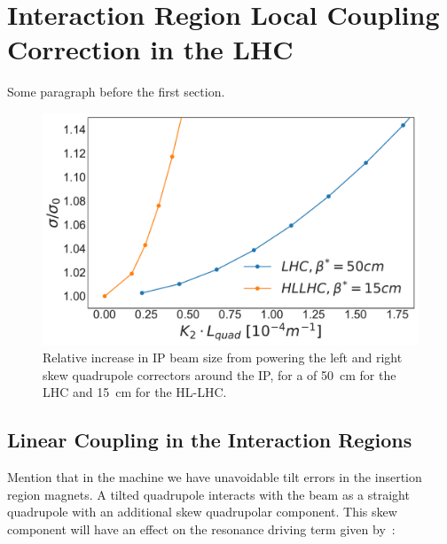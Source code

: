 \chapter{Interaction Region Local Coupling Correction in the LHC} %

\label{Chapter:IR_Local_Coupling} %


Some paragraph before the first section.

\begin{figure}
    \centering
    \includegraphics*[width=0.9\linewidth]{Figures/Chapter4/lhc_vs_hllhc_ratios_normalised.pdf}
    \caption{Relative increase in IP beam size from powering the left and right skew quadrupole correctors around the IP, for a \betastar of \qty{50}{\centi\metre} for the LHC and \qty{15}{\centi\meter} for the HL-LHC.}
    \label{figure:}
\end{figure}


\section{Linear Coupling in the Interaction Regions}

Mention that in the machine we have unavoidable tilt errors in the insertion region magnets.
A tilted quadrupole interacts with the beam as a straight quadrupole with an additional skew quadrupolar component.
This skew component will have an effect on the \foneohone resonance driving term given by~\cite{PRAB:Calaga:MergingHamiltonianMatrixApproches}:

